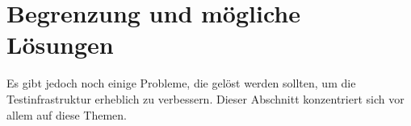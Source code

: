 \section{Begrenzung und mögliche Lösungen}

Es gibt jedoch noch einige Probleme, die gelöst werden sollten,
um die Testinfrastruktur erheblich zu verbessern. Dieser Abschnitt
konzentriert sich vor allem auf diese Themen.




